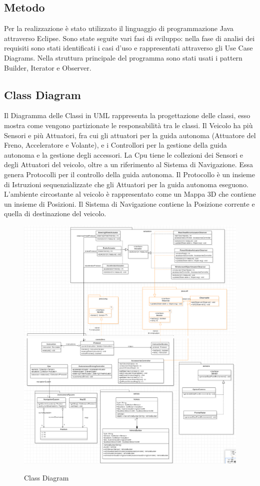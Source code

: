 \documentclass{article}
\begin{document}
\subsection{Metodo}
Per la realizzazione è stato utilizzato il linguaggio di programmazione Java attraverso Eclipse. Sono state seguite vari fasi di sviluppo:
nella fase di analisi dei requisiti sono stati identificati i casi d'uso e rappresentati attraverso gli Use Case Diagrams. Nella struttura principale del programma sono stati usati i pattern Builder, Iterator e Observer. 


\subsection{Class Diagram}
Il Diagramma delle Classi in UML rappresenta la progettazione delle classi, esso mostra come vengono partizionate le responsabilità tra le classi.
Il Veicolo ha più Sensori e più Attuatori, fra cui gli attuatori per la guida autonoma (Attuatore del Freno, Acceleratore e Volante), e i Controllori per la gestione della guida autonoma e la gestione degli accessori.  
La Cpu tiene le collezioni dei Sensori e degli Attuatori del veicolo, oltre a un riferimento al Sistema di Navigazione. Essa genera Protocolli per il controllo della guida autonoma.
Il Protocollo è un insieme di Istruzioni sequenzializzate che gli Attuatori per la guida autonoma eseguono. 
L'ambiente circostante al veicolo è rappresentato come un Mappa 3D che contiene un insieme di Posizioni. Il Sistema di Navigazione contiene la Posizione corrente e quella di destinazione del veicolo.

\begin{figure} [H]
\includegraphics[width=1.3\textwidth,center]{part1.png}
\includegraphics[width=1.3\textwidth,center]{part2.png}
\caption{Class Diagram}
\end{figure}
\end{document}

